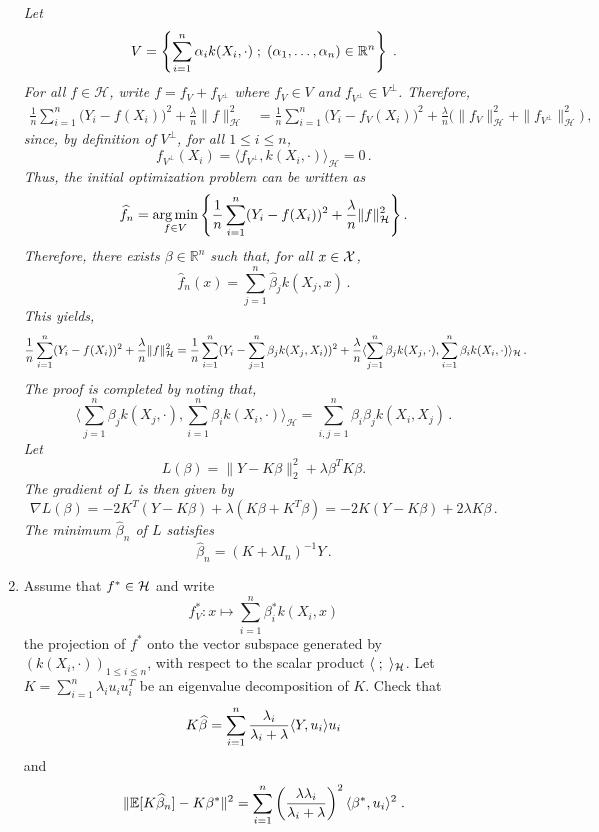 \begin{enumerate}
{\em
Let  
$$
V = \left\{ \sum_{i=1}^{n}\alpha_ik(X_i, \cdot)\;;\;  (\alpha_1,\ldots,\alpha_n)\in\mathbb{R}^n\right\}\;.
$$  
For all $f \in \mathcal{H}$, write $f = f_V + f_{V^{\perp}}$ where $f_V \in V$ and $f_{V^{\perp}} \in V^{\perp}$. Therefore,
		\begin{align*}
			\frac{1}{n} \sum_{i=1}^n \Big( Y_i - f(X_i) \Big)^2 + \frac{\lambda}{n} \|f\|_{\mathcal{H}}^2
			& = 	\frac{1}{n} \sum_{i=1}^n \Big( Y_i - f_V(X_i) \Big)^2 + \frac{\lambda}{n} \Big( \|f_V\|_{\mathcal{H}}^2 + \|f_{V^{\perp}}\|_{\mathcal{H}}^2 \Big)\,,
		\end{align*}	
		since, by definition of $V^{\perp}$, for all $1 \leqslant i \leqslant n$,  
		$$
		f_{V^{\perp}}(X_i) = \langle f_{V^{\perp}} , k(X_i, \cdot) \rangle_{\mathcal{H}} = 0\,. 
		$$
		Thus, the initial optimization problem can be written as
$$
\widehat f_n=\argmin_{f\in V}\left\{{1\over n}\sum_{i=1}^n(Y_{i}-f(X_{i}))^2+{\lambda\over n} \|f\|_{\mathcal{H}}^2\right\}.
$$
Therefore, there exists $\beta\in\mathbb{R}^n$ such that, for all $x\in\mathcal{X}$,
$$
\widehat{f}_n(x) = \sum_{j=1}^n \widehat{\beta}_j k(X_j, x)\,.
$$
This yields,
$$
{1\over n}\sum_{i=1}^n(Y_{i}-f(X_{i}))^2+{\lambda\over n} \|f\|_{\mathcal{H}}^2 = {1\over n}\sum_{i=1}^n(Y_{i}-\sum_{j=1}^n \beta_j k(X_j, X_i))^2+{\lambda\over n} \langle \sum_{j=1}^n \beta_j k(X_j, \cdot), \sum_{i=1}^n \beta_i k(X_i, \cdot) \rangle_{\mathcal{H}}\,.
$$
The proof is completed by noting that,
$$
\langle \sum_{j=1}^n \beta_j k(X_j, \cdot), \sum_{i=1}^n \beta_i k(X_i, \cdot) \rangle_{\mathcal{H}}  = \sum_{i,j=1}^n \beta_i \beta_j k(X_i, X_j)\,.
$$
Let 
$$
L(\beta) = \| Y - K \beta\|_2^2 + \lambda \beta^T K \beta.
$$
The gradient of $L$ is then given by
$$
\nabla L (\beta)  = -2K^T (Y - K \beta) + \lambda (K \beta + K^T \beta)   = -2K(Y-K \beta) + 2 \lambda K \beta\,.
$$
The minimum $\widehat{\beta}_n$ of $L$ satisfies 
$$
\widehat{\beta}_n = (K + \lambda I_n)^{-1} Y\,.
$$
}
\item Assume that $f^*\in\mathcal{H}$ and write 
$$
f^*_{V}: x\mapsto \sum_{i=1}^n \beta_{i}^*k(X_{i},x)
$$ 
the projection of $f^*$ onto the vector subspace generated by  $(k(X_{i},\cdot))_{1\leqslant i \leqslant n}$, with respect to the scalar product $\langle \;;\; \rangle_{\mathcal{H}}$. Let $K=\sum_{i=1}^n \lambda_{i}u_{i}u_{i}^T$ be  an eigenvalue decomposition of $K$. Check that 
\[
K\widehat \beta= \sum_{i=1}^n {\lambda_{i}\over \lambda_{i}+\lambda} \langle Y, u_{i}\rangle u_{i}
\]
and
\[
\|\mathbb{E}[K\widehat \beta_n]-K\beta^*\|^2=\sum_{i=1}^n \left( \lambda\lambda_{i}\over \lambda_{i}+\lambda\right)^2 \langle \beta^*, u_{i}\rangle^2\;.
\]


\end{enumerate}
